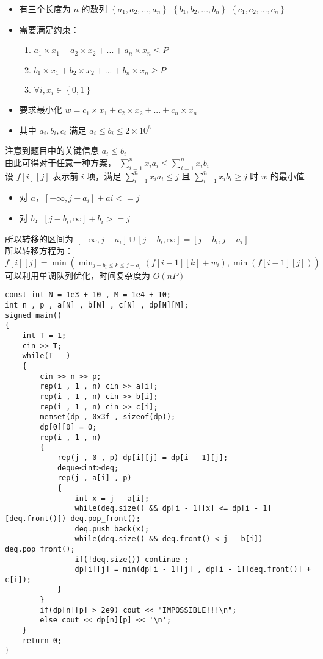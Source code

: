 \documentclass[E:/GsjzTle/main/main.tex]{subfiles}
\begin{document}
\begin{itemize}
\item
  有三个长度为 \(n\) 的数列
  \(\left\{ a_{1}, a_{2}, . . . , a_{n} \right\}\)
  \(\left\{ b_{1}, b_{2}, . . . , b_{n} \right\}\)
  \(\left\{ c_{1}, c_{2}, . . . , c_{n} \right\}\)
\item
  需要满足约束：

  \begin{enumerate}
  \def\labelenumi{\arabic{enumi}.}
  \item
    \(a_{1} \times x_{1}+a_{2} \times x_{2}+...+a_{n} \times x_{n} \leq P\)
  \item
    \(b_{1} \times x_{1}+b_{2} \times x_{2}+...+b_{n} \times x_{n} \geq P\)
  \item
    \(∀i, x_{i}∈\left\{ 0,1 \right\}\)
  \end{enumerate}
\item
  要求最小化
  \(w=c_{1} \times x_{1}+c_{2} \times x_{2}+...+c_{n} \times x_{n}\)
\item
  其中 \(a_{i},b_{i},c_{i}\) 满足
  \(a_{i} \leq b_{i} \leq   2\times10^{6}\)
\end{itemize}

注意到题目中的关键信息 \(a_{i} \leq b_{i}\)\\
由此可得对于任意一种方案，
\(\sum\limits_{i=1}^nx_ia_i\le\sum\limits_{i=1}^nx_ib_i\) \\
设 \(f[i][j]\) 表示前 \(i\) 项，满足 \(\sum\limits_{i=1}^nx_ia_i\le j\)
且 \(\sum\limits_{i=1}^nx_ib_i≥j\) 时 \(w\) 的最小值

\begin{itemize}
\item
  对 \(a\)，\([-\infty ,j-a_i]+ai<=j\)
\item
  对 \(b\)，\([j-b_i, \infty] + b_i >=j\)
\end{itemize}

所以转移的区间为
\([-\infty ,j-a_i]\cup[j-b_i, \infty] = [j - b_i,j-a_i]\)\\
所以转移方程为：\(f[i][j]=\min \left(\min _{j-b_{i} \leq k \leq j+a_{i}}\left(f[i-1][k]+w_{i}\right), \min (f[i-1][j])\right)\)\\
可以利用单调队列优化，时间复杂度为 \(O(nP)\)

\begin{lstlisting}
const int N = 1e3 + 10 , M = 1e4 + 10;
int n , p , a[N] , b[N] , c[N] , dp[N][M];
signed main()
{
	int T = 1;
	cin >> T;
	while(T --)
	{
		cin >> n >> p;
		rep(i , 1 , n) cin >> a[i];
		rep(i , 1 , n) cin >> b[i];
		rep(i , 1 , n) cin >> c[i];
		memset(dp , 0x3f , sizeof(dp));
		dp[0][0] = 0;
		rep(i , 1 , n)
		{
			rep(j , 0 , p) dp[i][j] = dp[i - 1][j];
			deque<int>deq;
			rep(j , a[i] , p)
			{
				int x = j - a[i];
				while(deq.size() && dp[i - 1][x] <= dp[i - 1][deq.front()]) deq.pop_front();
				deq.push_back(x);
				while(deq.size() && deq.front() < j - b[i])	deq.pop_front();
				if(!deq.size()) continue ;
				dp[i][j] = min(dp[i - 1][j] , dp[i - 1][deq.front()] + c[i]);
			}
		}
		if(dp[n][p] > 2e9) cout << "IMPOSSIBLE!!!\n";
		else cout << dp[n][p] << '\n';
	}
	return 0;
}
\end{lstlisting}
\end{document}
